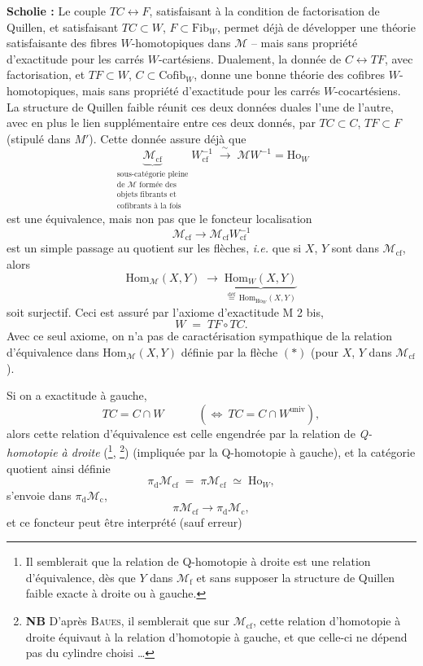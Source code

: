 \documentclass[11pt]{article}
\newcommand{\msp}[1]{\marginpar{\footnotesize [#1]}}
\newcommand{\univ}{\mathrm{univ}}
\newcommand{\Fib}{\mathrm{Fib}}
\begin{document}
\noindent\textbf{Scholie :} Le couple $TC \longleftrightarrow F$, satisfaisant à la condition de factorisation de Quillen, et satisfaisant $TC \subset W$, $F \subset \Fib_W$, permet déjà de développer une théorie satisfaisante des fibres $W$-homotopiques dans $\mathcal{M}$ -- mais sans propriété d'exactitude pour les carrés $W$-cartésiens. Dualement, la donnée de $C \longleftrightarrow TF$, avec factorisation, et $TF \subset W$, $C \subset \mathrm{Cofib}_W$, donne une bonne théorie des cofibres $W$-homotopiques, mais sans propriété d'exactitude pour les carrés $W$-cocartésiens. La structure de Quillen faible réunit ces deux données duales l'une de l'autre, avec en plus le lien supplémentaire entre ces deux donnés, par $TC \subset C$, $TF \subset F$ (stipulé dans $M'$). Cette donnée assure déjà que %
\[
\underbrace{\mathcal{M}_{\mathrm{cf}}}_{\substack{\text{sous-catégorie pleine}\\ \text{de $\mathcal{M}$ formée des}\\ \text{objets fibrants et}\\ \text{cofibrants à la fois}}} W_{\mathrm{cf}}^{-1} \;\xrightarrow{\ \sim\ }\; \mathcal{M}W^{-1} = \mathrm{Ho}_W
\]
\msp{page 30}
est une équivalence, mais non pas que le foncteur localisation
\[
\mathcal{M}_{\mathrm{cf}} \longrightarrow \mathcal{M}_{\mathrm{cf}}W_{\mathrm{cf}}^{-1}
\]
est un simple passage au quotient sur les flèches, \textit{i.e.} que si $X$, $Y$ sont dans $\mathcal{M}_{\mathrm{cf}}$, alors
\[
\mathrm{Hom}_{\mathcal{M}}(X, Y) \;\longrightarrow\; \underbrace{\mathrm{Hom}_W(X, Y)}_{\overset{\text{déf}}{=}\,\mathrm{Hom}_{\mathrm{Ho}_W}(X, Y)} \tag*{$(*)$}
\]
soit surjectif. Ceci est assuré par l'axiome d'exactitude M 2 bis,
\[
W \;=\; TF \circ TC.
\]
Avec ce seul axiome, on n'a pas de caractérisation sympathique de la relation d'équivalence dans $\mathrm{Hom}_{\mathcal{M}}(X, Y)$ définie par la flèche $(*)$ (pour $X$, $Y$ dans $\mathcal{M}_{\mathrm{cf}}$).

Si on a exactitude à gauche,
\[
TC = C \cap W \qquad\quad (\Longleftrightarrow\ TC = C \cap W^{\univ}),
\]
alors cette relation d'équivalence est celle engendrée par la relation de \textit{Q-homotopie à droite} (\footnote[22]{Il semblerait que la relation de Q-homotopie à droite est une relation d'équivalence, dès que $Y$ dans $\mathcal{M}_{\mathrm{f}}$ et sans supposer la structure de Quillen faible exacte à droite ou à gauche.}, \footnote[23]{\textbf{NB} D'après \textsc{Baues}, il semblerait que sur $\mathcal{M}_{\mathrm{cf}}$, cette relation d'homotopie à droite équivaut à la relation d'homotopie à gauche, et que celle-ci ne dépend pas du cylindre choisi \ldots}) (impliquée par la Q-homotopie à gauche), et la catégorie quotient ainsi définie
\[
\pi_{\mathrm{d}}\mathcal{M}_{\mathrm{cf}} \;=\; \pi\mathcal{M}_{\mathrm{cf}} \;\simeq\; \mathrm{Ho}_W,
\]
s'envoie dans $\pi_{\mathrm{d}}\mathcal{M}_{\mathrm{c}}$,
\[
\pi\mathcal{M}_{\mathrm{cf}} \longrightarrow \pi_{\mathrm{d}}\mathcal{M}_{\mathrm{c}},
\]
et ce foncteur peut être interprété (sauf erreur)
\end{document}
